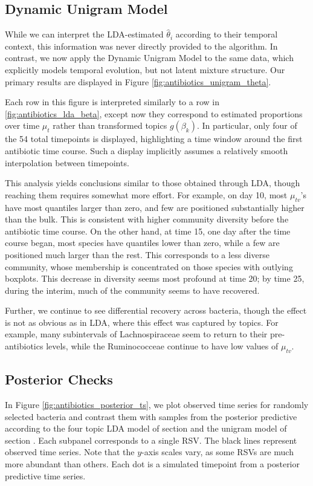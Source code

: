 \documentclass[oupdraft]{bio}
\begin{document}
\subsection{Dynamic Unigram Model}

While we can interpret the LDA-estimated $\hat{\theta}_{i}$ according to their
temporal context, this information was never directly provided to the algorithm.
In contrast, we now apply the Dynamic Unigram Model to the same data, which
explicitly models temporal evolution, but not latent mixture structure. Our
primary results are displayed in Figure \ref{fig:antibiotics_unigram_theta}.

Each row in this figure is interpreted similarly to a row in
\ref{fig:antibiotics_lda_beta}, except now they correspond to estimated
proportions over time $\mu_{t}$ rather than transformed topics
$g\left(\beta_{k}\right)$. In particular, only four of the 54 total timepoints
is displayed, highlighting a time window around the first antibiotic time
course. Such a display implicitly assumes a relatively smooth interpolation
between timepoints.

This analysis yields conclusions similar to those obtained through LDA, though
reaching them requires somewhat more effort. For example, on day 10, most
$\mu_{tv}$'s have most quantiles larger than zero, and few are positioned
substantially higher than the bulk. This is consistent with higher community
diversity before the antibiotic time course. On the other hand, at time 15, one
day after the time course began, most species have quantiles lower than zero,
while a few are positioned much larger than the rest. This corresponds to a less
diverse community, whose membership is concentrated on those species with
outlying boxplots. This decrease in diversity seems most profound at time 20; by
time 25, during the interim, much of the community seems to have recovered.

Further, we continue to see differential recovery across bacteria, though the
effect is not as obvious as in LDA, where this effect was captured by topics.
For example, many subintervals of Lachnospiraceae seem to return to their
pre-antibiotics levels, while the Ruminococceae continue to have low values of
$\mu_{tv}$.

\subsection{Posterior Checks}

In Figure \ref{fig:antibiotics_posterior_ts}, we plot observed time series for
randomly selected bacteria and contrast them with samples from the posterior
predictive according to the four topic LDA model of
section \label{sec:antibiotics_lda} and the unigram model of
section \label{sec:antibiotics_unigram}. Each subpanel corresponds to a single
RSV. The black lines represent observed time series. Note that the $y$-axis scales
vary, as some RSVs are much more abundant than others. Each dot is a simulated
timepoint from a posterior predictive time series.
\end{document}
